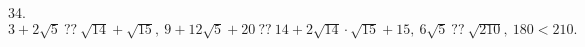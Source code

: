 34. $3+2\sqrt{5}\ ??\ \sqrt{14}+\sqrt{15},\ 9+12\sqrt{5}+20\ ??\ 14+2\sqrt{14}\cdot\sqrt{15}+15,\ 6\sqrt{5}\ ??\ \sqrt{210},\ 180<210.$\\
